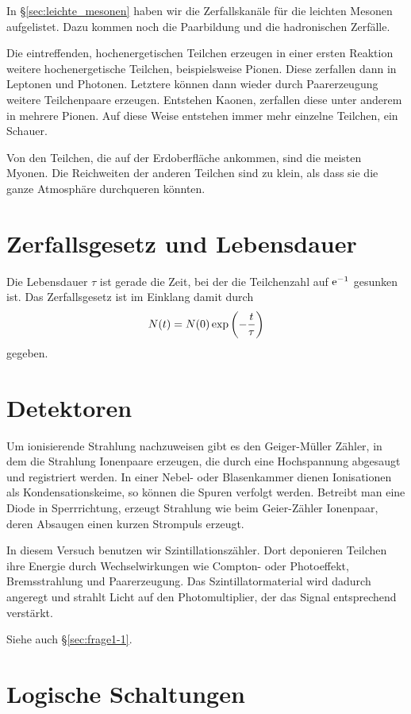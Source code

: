\documentclass[11pt, ngerman, fleqn, DIV=15, headinclude, BCOR=2cm]{scrreprt}
\begin{document}
In §\ref{sec:leichte_mesonen} haben wir die Zerfallskanäle für die leichten
Mesonen aufgelistet. Dazu kommen noch die Paarbildung und die hadronischen
Zerfälle.

Die eintreffenden, hochenergetischen Teilchen erzeugen in einer
ersten Reaktion weitere hochenergetische Teilchen, beispielsweise Pionen. Diese
zerfallen dann in Leptonen und Photonen. Letztere können dann wieder durch
Paarerzeugung weitere Teilchenpaare erzeugen. Entstehen Kaonen, zerfallen diese
unter anderem in mehrere Pionen. Auf diese Weise entstehen immer mehr
einzelne Teilchen, ein Schauer.

Von den Teilchen, die auf der Erdoberfläche ankommen, sind die meisten Myonen.
Die Reichweiten der anderen Teilchen sind zu klein, als dass sie die ganze
Atmosphäre durchqueren könnten. \parencite[110]{Grupen/Astroteilchenphysik}

\section{Zerfallsgesetz und Lebensdauer}

Die Lebensdauer $\tau$ ist gerade die Zeit, bei der die Teilchenzahl auf
$\mathrm e^{-1}$ gesunken ist. Das Zerfallsgesetz ist im Einklang damit durch
\[
    N(t) = N(0) \exp\del{- \frac t\tau}
\]
gegeben.

\section{Detektoren}

Um ionisierende Strahlung nachzuweisen gibt es den Geiger-Müller Zähler, in dem
die Strahlung Ionenpaare erzeugen, die durch eine Hochspannung abgesaugt und
registriert werden. In einer Nebel- oder Blasenkammer dienen Ionisationen als
Kondensationskeime, so können die Spuren verfolgt werden. Betreibt man eine
Diode in Sperrrichtung, erzeugt Strahlung wie beim Geier-Zähler Ionenpaar,
deren Absaugen einen kurzen Strompuls erzeugt.

In diesem Versuch benutzen wir Szintillationszähler. Dort deponieren Teilchen
ihre Energie durch Wechselwirkungen wie Compton- oder Photoeffekt,
Bremsstrahlung und Paarerzeugung. Das Szintillatormaterial wird dadurch
angeregt und strahlt Licht auf den Photomultiplier, der das Signal entsprechend
verstärkt.

Siehe auch §\ref{sec:frage1-1}.

\section{Logische Schaltungen}
\end{document}
